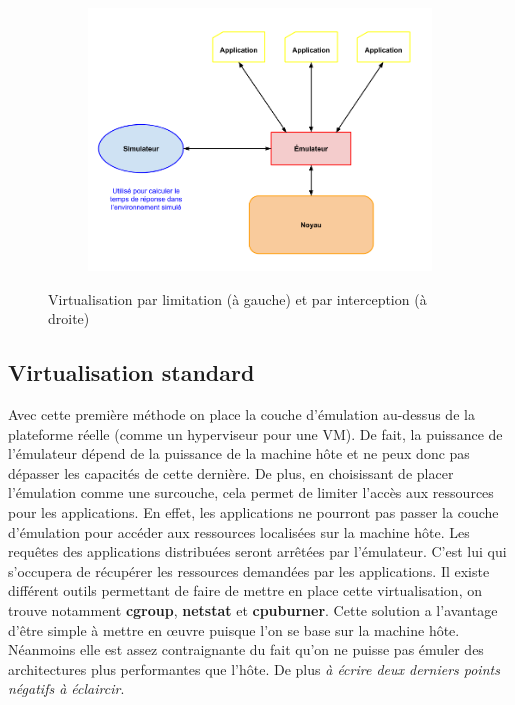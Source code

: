 \begin{figure}[H]
\begin{subfigure}{0.3\textwidth}
    \includegraphics[scale=0.3]{Pictures/png/Virtualisation_interception}
  \end{subfigure}
  \caption{Virtualisation par limitation (à gauche) et par interception (à droite)}
  \label{TYPE_VIRTUALISATION}
\end{figure}

\subsection{Virtualisation standard}

Avec cette première méthode on place la couche d'émulation au-dessus de la
plateforme réelle (comme un hyperviseur pour une VM). De fait, la puissance de
l'émulateur dépend de la puissance de la machine hôte et ne peux donc pas
dépasser les capacités de cette dernière. De plus, en
choisissant de placer l'émulation comme une surcouche, cela permet de limiter
l'accès aux ressources pour les applications. En effet, les applications ne
pourront pas passer la couche d'émulation pour accéder aux ressources localisées
sur la machine hôte. Les requêtes des applications distribuées seront arrêtées
par l'émulateur. C'est lui qui s'occupera de récupérer les ressources demandées
par les applications. Il existe différent outils permettant de faire de mettre
en place cette virtualisation, on trouve notamment \textbf{cgroup},
\textbf{netstat} et \textbf{cpuburner}.  Cette solution a l'avantage d'être
simple à mettre en \oe uvre puisque l'on se base sur la machine hôte. Néanmoins
elle est assez contraignante du fait qu'on ne puisse pas émuler des
architectures plus performantes que l'hôte. De plus {\color{red} \textit{à
    écrire deux derniers points négatifs à éclaircir}}.

